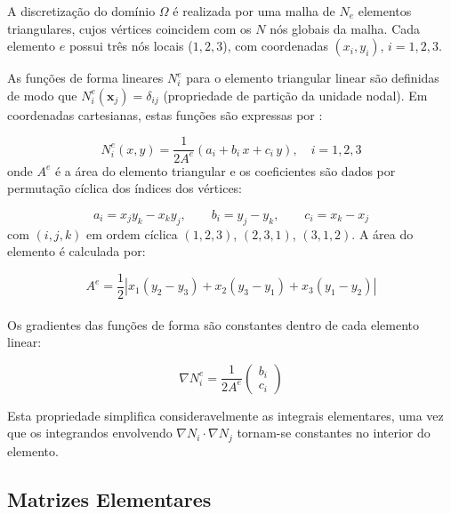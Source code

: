 A discretização do domínio $\Omega$ é realizada por uma malha de $N_e$ elementos triangulares, cujos vértices coincidem com os $N$ nós globais da malha. Cada elemento $e$ possui três nós locais ($1, 2, 3$), com coordenadas $(x_i, y_i)$, $i = 1, 2, 3$.

As funções de forma lineares $N_i^e$ para o elemento triangular linear são definidas de modo que $N_i^e(\mathbf{x}_j) = \delta_{ij}$ (propriedade de partição da unidade nodal). Em coordenadas cartesianas, estas funções são expressas por \cite{Reddy2005}:

\begin{equation}
N_i^e(x, y) = \frac{1}{2A^e} (a_i + b_i \, x + c_i \, y), \quad i = 1, 2, 3
\label{eq:funcoes_forma_p1}
\end{equation}
onde $A^e$ é a área do elemento triangular e os coeficientes são dados por permutação cíclica dos índices dos vértices:

\begin{equation}
a_i = x_j y_k - x_k y_j, \qquad b_i = y_j - y_k, \qquad c_i = x_k - x_j
\label{eq:coeficientes_p1}
\end{equation}
com $(i, j, k)$ em ordem cíclica $(1,2,3)$, $(2,3,1)$, $(3,1,2)$. A área do elemento é calculada por:

\begin{equation}
A^e = \frac{1}{2} \left| x_1(y_2 - y_3) + x_2(y_3 - y_1) + x_3(y_1 - y_2) \right|
\label{eq:area_elemento}
\end{equation}

\paragraph{}Os gradientes das funções de forma são constantes dentro de cada elemento linear:

\begin{equation}
\nabla N_i^e = \frac{1}{2A^e} \begin{pmatrix} b_i \\ c_i \end{pmatrix}
\label{eq:gradiente_p1}
\end{equation}

Esta propriedade simplifica consideravelmente as integrais elementares, uma vez que os integrandos envolvendo $\nabla N_i \cdot \nabla N_j$ tornam-se constantes no interior do elemento.

\subsection{Matrizes Elementares}
\label{sec:matrizes_elementares}

